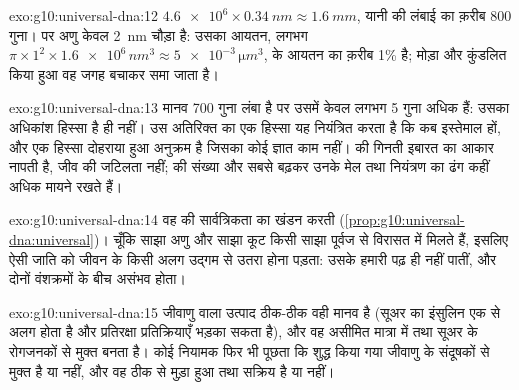 \begin{solution}{exo:g10:universal-dna:12}
$\num{4.6e6} \times \qty{0.34}{nm} \approx \qty{1.6}{mm}$, यानी 
की लंबाई का क़रीब 800 गुना। पर अणु केवल \qty{2}{nm} चौड़ा है: उसका
आयतन, लगभग $\pi \times 1^2 \times \num{1.6e6}\,
\unit{nm^3} \approx \num{5e-3}\,\unit{\micro m^3}$,  के आयतन का
क़रीब 1\% है; मोड़ा और कुंडलित किया हुआ वह जगह बचाकर समा जाता है।
\end{solution}

\begin{solution}{exo:g10:universal-dna:13}
मानव  700 गुना लंबा है पर उसमें  केवल लगभग 5 गुना अधिक हैं: उसका
अधिकांश हिस्सा  है ही नहीं। उस अतिरिक्त  का एक हिस्सा यह नियंत्रित
करता है कि  कब इस्तेमाल हों, और एक हिस्सा दोहराया हुआ अनुक्रम है
जिसका कोई ज्ञात काम नहीं।  की गिनती इबारत का आकार नापती है, जीव
की जटिलता नहीं;  की संख्या और सबसे बढ़कर उनके मेल तथा नियंत्रण का
ढंग कहीं अधिक मायने रखते हैं।
\end{solution}

\begin{solution}{exo:g10:universal-dna:14}
वह  की सार्वत्रिकता का खंडन करती
(\cref{prop:g10:universal-dna:universal})। चूँकि साझा अणु और साझा कूट
किसी साझा पूर्वज से विरासत में मिलते हैं, इसलिए ऐसी जाति को जीवन के किसी
अलग उद्गम से उतरा होना पड़ता: उसके  हमारी  पढ़ ही नहीं
पातीं, और दोनों वंशक्रमों के बीच  असंभव होता।
\end{solution}

\begin{solution}{exo:g10:universal-dna:15}
जीवाणु वाला उत्पाद ठीक-ठीक वही मानव  है (सूअर का इंसुलिन एक  से अलग होता है और प्रतिरक्षा प्रतिक्रियाएँ भड़का सकता है), और वह
असीमित मात्रा में तथा सूअर के रोगजनकों से मुक्त बनता है। कोई नियामक फिर
भी पूछता कि शुद्ध किया गया  जीवाणु के संदूषकों से मुक्त है या
नहीं, और वह ठीक से मुड़ा हुआ तथा सक्रिय है या नहीं।
\end{solution}

